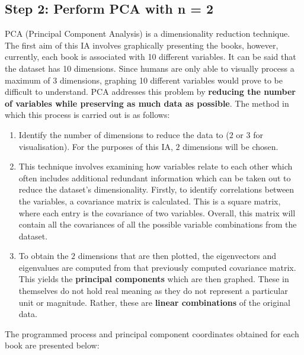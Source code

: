 \documentclass[12pt]{article}
\begin{document}
\subsection{Step 2: Perform PCA with n = 2}
PCA (Principal Component Analysis) is a dimensionality reduction technique. The first aim of this IA involves graphically presenting the books, however, currently, each book is associated with 10 different variables. It can be said that the dataset has 10 dimensions. Since humans are only able to visually process a maximum of 3 dimensions, graphing 10 different variables would prove to be difficult to understand. PCA addresses this problem by \textbf{reducing the number of variables while preserving as much data as possible}.
\parencite{1} The method in which this process is carried out is as follows:

\begin{enumerate}
    \item Identify the number of dimensions to reduce the data to ($2$ or $3$ for visualisation). For the purposes of this IA, $2$ dimensions will be chosen.
    \item This technique involves examining how variables relate to each other which often includes additional redundant information which can be taken out to reduce the dataset’s dimensionality. Firstly, to identify correlations between the variables, a covariance matrix is calculated. This is a square matrix, where each entry is the covariance of two variables. Overall, this matrix will contain all the covariances of all the possible variable combinations from the dataset.
    \item To obtain the $2$ dimensions that are then plotted, the eigenvectors and eigenvalues are computed from that previously computed covariance matrix. This yields the \textbf{principal components} which are then graphed. These in themselves do not hold real meaning as they do not represent a particular unit or magnitude. Rather, these are \textbf{linear combinations} of the original data.
\end{enumerate}

The programmed process and principal component coordinates obtained for each book are presented below:
\end{document}

